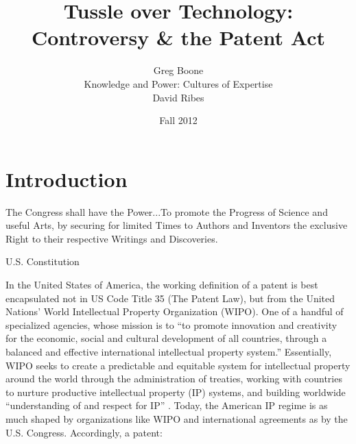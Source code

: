 \documentclass[pdftex,12pt,letterpaper]{article}
\title{Tussle over Technology: Controversy \& the Patent Act}
\author{Greg Boone \\ Knowledge and Power: Cultures of Expertise \\ David Ribes}
\date{Fall 2012}
\begin{document}
\maketitle


\section*{Introduction}

\epigraph{The Congress shall have the Power...To promote the Progress of Science and useful Arts, by securing for limited Times to Authors and Inventors the exclusive Right to their respective Writings and Discoveries.}{U.S. Constitution}

In the United States of America, the working definition of a patent is best encapsulated not in US Code Title 35 (The Patent Law), but from the United Nations' World Intellectual Property Organization (WIPO). One of a handful of specialized agencies, whose mission is to ``to promote innovation and creativity for the economic, social and cultural development of all countries, through a balanced and effective international intellectual property system.'' Essentially, WIPO seeks to create a predictable and equitable system for intellectual property around the world through the administration of treaties, working with countries to nurture productive intellectual property (IP) systems, and building worldwide ``understanding of and respect for IP'' \autocite{WIPO2012}. Today, the American IP regime is as much shaped by organizations like WIPO and international agreements as by the U.S. Congress. Accordingly, a patent:
\end{document}

